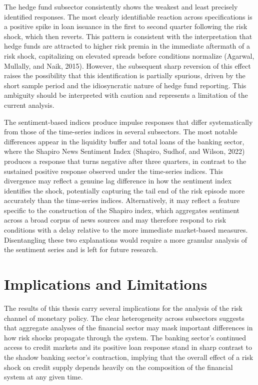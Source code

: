 \documentclass[12pt,a4paper]{report}\usepackage[a4paper, top=2.5cm, bottom=2.5cm, left=2.5cm, right=2.5cm]{geometry}
\begin{document}
The hedge fund subsector consistently shows the weakest and least precisely
identified responses. The most clearly identifiable reaction across specifications
is a positive spike in loan issuance in the first to second quarter following
the risk shock, which then reverts. This pattern is consistent with the
interpretation that hedge funds are attracted to higher risk premia in the
immediate aftermath of a risk shock, capitalizing on elevated spreads before
conditions normalize (Agarwal, Mullally, and Naik, 2015). However, the
subsequent sharp reversion of this effect raises the possibility that this
identification is partially spurious, driven by the short sample period and
the idiosyncratic nature of hedge fund reporting. This ambiguity should be
interpreted with caution and represents a limitation of the current analysis.

The sentiment-based indices produce impulse responses that differ systematically
from those of the time-series indices in several subsectors. The most notable
differences appear in the liquidity buffer and total loans of the banking sector,
where the Shapiro News Sentiment Index (Shapiro, Sudhof, and Wilson, 2022)
produces a response that turns negative after three quarters, in contrast to the
sustained positive response observed under the time-series indices. This divergence
may reflect a genuine lag difference in how the sentiment index identifies the
shock, potentially capturing the tail end of the risk episode more accurately than
the time-series indices. Alternatively, it may reflect a feature specific to the
construction of the Shapiro index, which aggregates sentiment across a broad
corpus of news sources and may therefore respond to risk conditions with a delay
relative to the more immediate market-based measures. Disentangling these two
explanations would require a more granular analysis of the sentiment series and
is left for future research.

\section{Implications and Limitations}

The results of this thesis carry several implications for the analysis of the risk
channel of monetary policy. The clear heterogeneity across subsectors suggests
that aggregate analyses of the financial sector may mask important differences in
how risk shocks propagate through the system. The banking sector's continued
access to credit markets and its positive loan response stand in sharp contrast
to the shadow banking sector's contraction, implying that the overall effect of
a risk shock on credit supply depends heavily on the composition of the financial
system at any given time.
\end{document}
